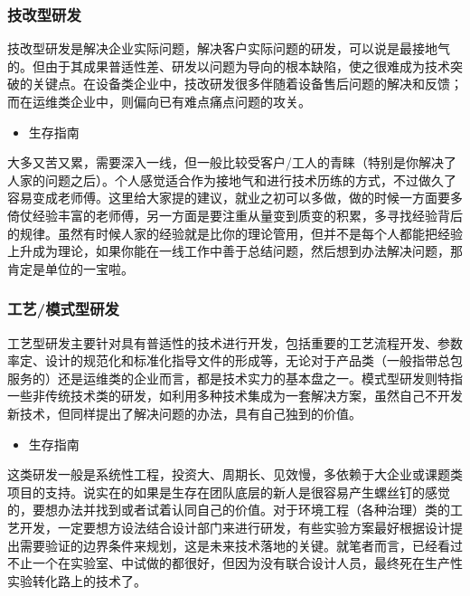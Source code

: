 \documentclass[]{book}
\providecommand{\tightlist}{%
  \setlength{\itemsep}{0pt}\setlength{\parskip}{0pt}}
\begin{document}
\hypertarget{ux6280ux6539ux578bux7814ux53d1}{%
\subsubsection{技改型研发}\label{ux6280ux6539ux578bux7814ux53d1}}

技改型研发是解决企业实际问题，解决客户实际问题的研发，可以说是最接地气的。但由于其成果普适性差、研发以问题为导向的根本缺陷，使之很难成为技术突破的关键点。在设备类企业中，技改研发很多伴随着设备售后问题的解决和反馈；而在运维类企业中，则偏向已有难点痛点问题的攻关。

\begin{itemize}
\tightlist
\item
  生存指南
\end{itemize}

大多又苦又累，需要深入一线，但一般比较受客户/工人的青睐（特别是你解决了人家的问题之后）。个人感觉适合作为接地气和进行技术历练的方式，不过做久了容易变成老师傅。这里给大家提的建议，就业之初可以多做，做的时候一方面要多倚仗经验丰富的老师傅，另一方面是要注重从量变到质变的积累，多寻找经验背后的规律。虽然有时候人家的经验就是比你的理论管用，但并不是每个人都能把经验上升成为理论，如果你能在一线工作中善于总结问题，然后想到办法解决问题，那肯定是单位的一宝啦。

\hypertarget{ux5de5ux827aux6a21ux5f0fux578bux7814ux53d1}{%
\subsubsection{工艺/模式型研发}\label{ux5de5ux827aux6a21ux5f0fux578bux7814ux53d1}}

工艺型研发主要针对具有普适性的技术进行开发，包括重要的工艺流程开发、参数率定、设计的规范化和标准化指导文件的形成等，无论对于产品类（一般指带总包服务的）还是运维类的企业而言，都是技术实力的基本盘之一。模式型研发则特指一些非传统技术类的研发，如利用多种技术集成为一套解决方案，虽然自己不开发新技术，但同样提出了解决问题的办法，具有自己独到的价值。

\begin{itemize}
\tightlist
\item
  生存指南
\end{itemize}

这类研发一般是系统性工程，投资大、周期长、见效慢，多依赖于大企业或课题类项目的支持。说实在的如果是生存在团队底层的新人是很容易产生螺丝钉的感觉的，要想办法并找到或者试着认同自己的价值。对于环境工程（各种治理）类的工艺开发，一定要想方设法结合设计部门来进行研发，有些实验方案最好根据设计提出需要验证的边界条件来规划，这是未来技术落地的关键。就笔者而言，已经看过不止一个在实验室、中试做的都很好，但因为没有联合设计人员，最终死在生产性实验转化路上的技术了。
\end{document}
